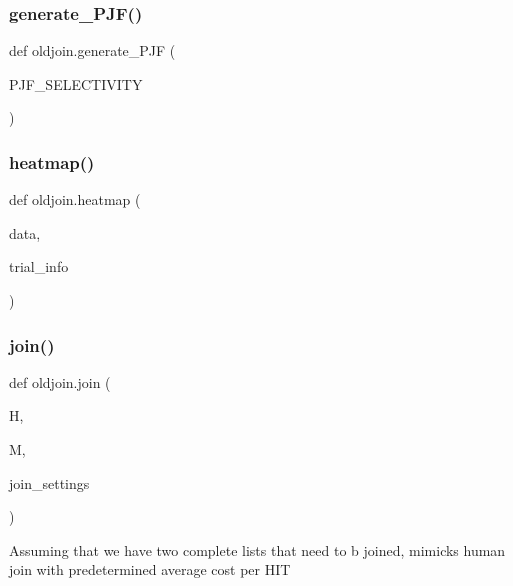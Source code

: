 \mbox{\label{namespaceoldjoin_ab07f8db55282bc2c19e5c6ddbdfb820a}} 
\subsubsection{\texorpdfstring{generate\+\_\+\+P\+J\+F()}{generate\_PJF()}}
{\footnotesize\ttfamily def oldjoin.\+generate\+\_\+\+P\+JF (\begin{DoxyParamCaption}\item[{}]{P\+J\+F\+\_\+\+S\+E\+L\+E\+C\+T\+I\+V\+I\+TY }\end{DoxyParamCaption})}

\mbox{\label{namespaceoldjoin_ad1782de5b29177d53cd9ddf8972eee3c}} 
\subsubsection{\texorpdfstring{heatmap()}{heatmap()}}
{\footnotesize\ttfamily def oldjoin.\+heatmap (\begin{DoxyParamCaption}\item[{}]{data,  }\item[{}]{trial\+\_\+info }\end{DoxyParamCaption})}

\mbox{\label{namespaceoldjoin_a8636d8a4fb507de47bd554ef95397533}} 
\subsubsection{\texorpdfstring{join()}{join()}}
{\footnotesize\ttfamily def oldjoin.\+join (\begin{DoxyParamCaption}\item[{}]{H,  }\item[{}]{M,  }\item[{}]{join\+\_\+settings }\end{DoxyParamCaption})}

\begin{DoxyVerb}Assuming that we have two complete lists that need to b joined, mimicks human join
with predetermined average cost per HIT \end{DoxyVerb}
 \mbox{\label{namespaceoldjoin_ad2ce1a61d9eb32b5e5caedc2b9783a17}} 
